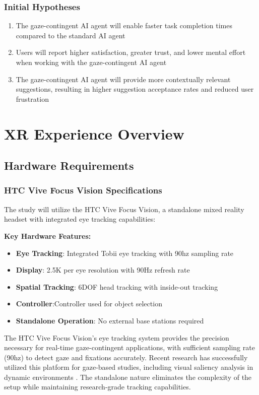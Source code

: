 \documentclass[12pt,letterpaper]{article}
\begin{document}
\subsubsection{Initial Hypotheses}
\begin{enumerate}
    \item The gaze-contingent AI agent will enable faster task completion times compared to the standard AI agent
    \item Users will report higher satisfaction, greater trust, and lower mental effort when working with the gaze-contingent AI agent
    \item The gaze-contingent AI agent will provide more contextually relevant suggestions, resulting in higher suggestion acceptance rates and reduced user frustration
\end{enumerate}

\section{XR Experience Overview}

\subsection{Hardware Requirements}

\subsubsection{HTC Vive Focus Vision Specifications}
The study will utilize the HTC Vive Focus Vision, a standalone mixed reality headset with integrated eye tracking capabilities:

\textbf{Key Hardware Features:}
\begin{itemize}
    \item \textbf{Eye Tracking}: Integrated Tobii eye tracking with 90hz sampling rate
    \item \textbf{Display}: 2.5K per eye resolution with 90Hz refresh rate
    \item \textbf{Spatial Tracking}: 6DOF head tracking with inside-out tracking
    \item \textbf{Controller}:Controller used for object selection
    \item \textbf{Standalone Operation}: No external base stations required
\end{itemize}

The HTC Vive Focus Vision's eye tracking system provides the precision necessary for real-time gaze-contingent applications, with sufficient sampling rate (90hz) to detect gaze and fixations accurately. Recent research has successfully utilized this platform for gaze-based studies, including visual saliency analysis in dynamic environments \citep{zhou2025comparison}. The standalone nature eliminates the complexity of the setup while maintaining research-grade tracking capabilities.
\end{document}
